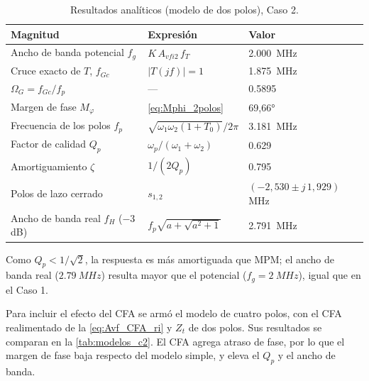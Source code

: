 \begin{table}[H]
\centering
\caption{Resultados analíticos (modelo de dos polos), Caso 2.}
\label{tab:analitica_c2}
\small
\setlength{\tabcolsep}{4pt}
\begin{tabular}{>{\raggedright\arraybackslash}p{} >{\centering\arraybackslash}p{} >{\centering\arraybackslash}p{}}
\toprule
\textbf{Magnitud} & \textbf{Expresión} & \textbf{Valor} \\
\midrule
Ancho de banda potencial $f_g$ & $K\,A_{vfi2}\,f_T$ & \SI{2,000}{MHz} \\
Cruce exacto de $T$, $f_{Gc}$ & $|T(jf)|=1$ & \SI{1,875}{MHz} \\
$\Omega_G = f_{Gc}/f_p$ & --- & \num{0,5895} \\
Margen de fase $M_\varphi$ & \autoref{eq:Mphi_2polos} & \ang{69,66} \\
Frecuencia de los polos $f_p$ & $\sqrt{\omega_1\omega_2(1+T_0)}/2\pi$ & \SI{3,181}{MHz} \\
Factor de calidad $Q_p$ & $\omega_p/(\omega_1+\omega_2)$ & \num{0,629} \\
Amortiguamiento $\zeta$ & $1/(2Q_p)$ & \num{0,795} \\
Polos de lazo cerrado & $s_{1,2}$ & $(-2{,}530 \pm j\,1{,}929)$ MHz \\
Ancho de banda real $f_H$ ($-3$ dB) & $f_p\sqrt{a+\sqrt{a^2+1}}$ & \SI{2,791}{MHz} \\
\bottomrule
\end{tabular}
\end{table}

Como $Q_p<1/\sqrt2$, la respuesta es más amortiguada que MPM; el ancho de banda real ($\SI{2,79}{MHz}$) resulta mayor que el potencial ($f_g=\SI{2}{MHz}$), igual que en el Caso 1.

Para incluir el efecto del CFA se armó el modelo de cuatro polos, con el CFA realimentado de la \autoref{eq:Avf_CFA_ri} y $Z_t$ de dos polos. Sus resultados se comparan en la \autoref{tab:modelos_c2}. El CFA agrega atraso de fase, por lo que el margen de fase baja respecto del modelo simple, y eleva el $Q_p$ y el ancho de banda.

